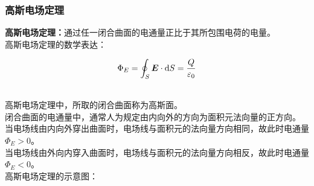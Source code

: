 \documentclass[UTF8]{ctexart}
\newcommand*{\veb}[1]{\vb*{#1}}
\newcommand*{\dif}{\mathop{}\!\mathrm{d}}
\begin{document}
\newpage

\subsubsection{高斯电场定理}
    \setcounter{equation}{0}
    \textbf{高斯电场定理：}通过任一闭合曲面的电通量正比于其所包围电荷的电量。\\[3mm]
    高斯电场定理的数学表达：
    \begin{large}
        \begin{equation*}
            \Phi_E=\oint_S \veb{E}\cdot\dif S=\frac{Q}{\varepsilon_0}
        \end{equation*}
    \end{large}\\
    高斯电场定理中，所取的闭合曲面称为高斯面。\\[3mm]
    闭合曲面的电通量中，通常人为规定由内向外的方向为面积元法向量的正方向。\\[3mm]
    当电场线由内向外穿出曲面时，电场线与面积元的法向量方向相同，故此时电通量$\Phi_E>0$。\\[3mm]
    当电场线由外向内穿入曲面时，电场线与面积元的法向量方向相反，故此时电通量$\Phi_E<0$。\\[6mm]
    高斯电场定理的示意图：
\end{document}
